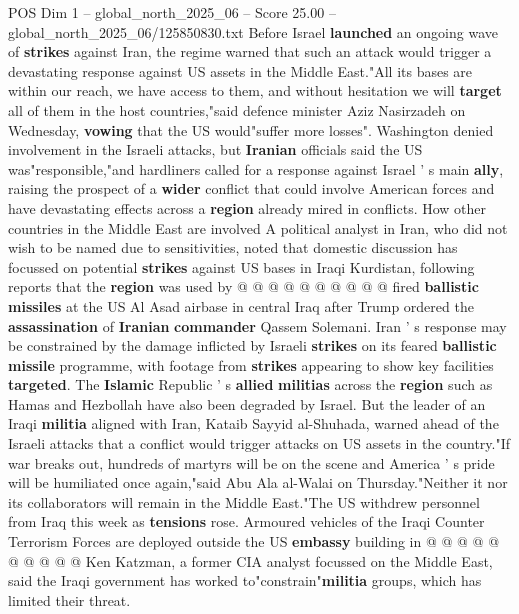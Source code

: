 \begin{textsample}{POS Dim 1 – global\_north\_2025\_06 – Score 25.00 – global\_north\_2025\_06/125850830.txt}  \label{ex:f1_pos_333}
Before Israel \textbf{launched} an ongoing wave of \textbf{strikes} against Iran, the regime warned that such an attack would trigger a devastating response against US assets in the Middle East."All its bases are within our reach, we have access to them, and without hesitation we will \textbf{target} all of them in the host countries,"said defence minister Aziz Nasirzadeh on Wednesday, \textbf{vowing} that the US would"suffer more losses".
Washington denied involvement in the Israeli attacks, but \textbf{Iranian} officials said the US was"responsible,"and hardliners called for a response against Israel ' s main \textbf{ally}, raising the prospect of a \textbf{wider} conflict that could involve American forces and have devastating effects across a \textbf{region} already mired in conflicts.
How other countries in the Middle East are involved A political analyst in Iran, who did not wish to be named due to sensitivities, noted that domestic discussion has focussed on potential \textbf{strikes} against US bases in Iraqi Kurdistan, following reports that the \textbf{region} was used by @ @ @ @ @ @ @ @ @ @ fired \textbf{ballistic} \textbf{missiles} at the US Al Asad airbase in central Iraq after Trump ordered the \textbf{assassination} of \textbf{Iranian} \textbf{commander} Qassem Solemani.
Iran ' s response may be constrained by the damage inflicted by Israeli \textbf{strikes} on its feared \textbf{ballistic} \textbf{missile} programme, with footage from \textbf{strikes} appearing to show key facilities \textbf{targeted}.
The \textbf{Islamic} Republic ' s \textbf{allied} \textbf{militias} across the \textbf{region} such as Hamas and Hezbollah have also been degraded by Israel.
But the leader of an Iraqi \textbf{militia} aligned with Iran, Kataib Sayyid al-Shuhada, warned ahead of the Israeli attacks that a conflict would trigger attacks on US assets in the country."If war breaks out, hundreds of martyrs will be on the scene and America ' s pride will be humiliated once again,"said Abu Ala al-Walai on Thursday."Neither it nor its collaborators will remain in the Middle East."The US withdrew personnel from Iraq this week as \textbf{tensions} rose.
Armoured vehicles of the Iraqi Counter Terrorism Forces are deployed outside the US \textbf{embassy} building in @ @ @ @ @ @ @ @ @ @ Ken Katzman, a former CIA analyst focussed on the Middle East, said the Iraqi government has worked to"constrain"\textbf{militia} groups, which has limited their threat.

\end{textsample}
